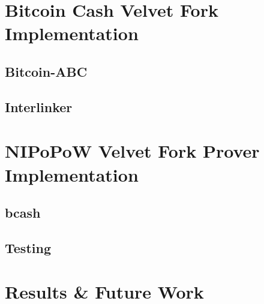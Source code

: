 \documentclass[11pt]{llncs}
\begin{document}
\section{Bitcoin Cash Velvet Fork Implementation}

\subsection{Bitcoin-ABC}
\subsection{Interlinker}

\section{NIPoPoW Velvet Fork Prover Implementation}

\subsection{bcash}
\subsection{Testing}

\section{Results \& Future Work}


\end{document}
